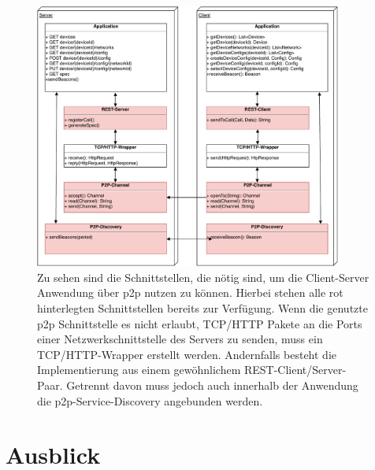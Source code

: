 \documentclass[12pt,a4paper]{article}
\begin{document}
	\begin{figure}[ht]
		\centering
	    \includegraphics[width=0.9\textwidth]{IOT-Connectivity-Protocol-Stack}
    	\caption{Zu sehen sind die Schnittstellen, die nötig sind, um die Client-Server Anwendung über p2p nutzen zu können. Hierbei stehen alle rot hinterlegten Schnittstellen bereits zur Verfügung. Wenn die genutzte p2p Schnittstelle es nicht erlaubt, TCP/HTTP Pakete an die Ports einer Netzwerkschnittstelle des Servers zu senden, muss ein TCP/HTTP-Wrapper erstellt werden. Andernfalls besteht die Implementierung aus einem gewöhnlichem REST-Client/Server-Paar. Getrennt davon muss jedoch auch innerhalb der Anwendung die p2p-Service-Discovery angebunden werden. }
	    \label{protocol_stack}
	\end{figure}    
    
    
    \pagebreak
\section{Ausblick}
\end{document}
